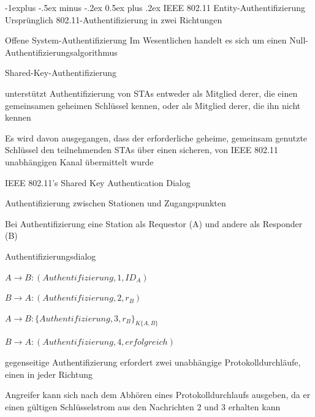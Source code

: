 \documentclass[a4paper]{article}
\makeatletter
\renewcommand{\subsection}{\@startsection{subsection}{2}{0mm}%
 {-1explus -.5ex minus -.2ex}%
 {0.5ex plus .2ex}%
 {\normalfont\normalsize\bfseries}}
\makeatother
\begin{document}
\begin{multicols}{3}
      \subsection{IEEE 802.11 Entity-Authentifizierung}
      Ursprünglich 802.11-Authentifizierung in zwei Richtungen
      \begin{description*}
            \item[Offene System-Authentifizierung] Im Wesentlichen handelt es sich um einen Null-Authentifizierungsalgorithmus
            \item[Shared-Key-Authentifizierung]
            \begin{itemize*}
                  \item unterstützt Authentifizierung von STAs entweder als Mitglied derer, die einen gemeinsamen geheimen Schlüssel kennen, oder als Mitglied derer, die ihn nicht kennen %
                  \item Es wird davon ausgegangen, dass der erforderliche geheime, gemeinsam genutzte Schlüssel den teilnehmenden STAs über einen sicheren, von IEEE 802.11 unabhängigen Kanal übermittelt wurde
            \end{itemize*}
      \end{description*}

      IEEE 802.11's Shared Key Authentication Dialog
      \begin{itemize*}
            \item Authentifizierung zwischen Stationen und Zugangspunkten %
            \item Bei Authentifizierung eine Station als Requestor (A) und andere als Responder (B)
            \item Authentifizierungsdialog
            \begin{enumerate*}
                  \item $A \rightarrow B: (Authentifizierung, 1, ID_A)$
                  \item $B \rightarrow A: (Authentifizierung, 2, r_B)$
                  \item $A \rightarrow B: \{Authentifizierung, 3, r_B\}_{K\{A,B\}}$
                  \item $B \rightarrow A: (Authentifizierung, 4, erfolgreich)$
            \end{enumerate*}
            \item gegenseitige Authentifizierung erfordert zwei unabhängige Protokolldurchläufe, einen in jeder Richtung
            \item Angreifer kann sich nach dem Abhören eines Protokolldurchlaufs ausgeben, da er einen gültigen Schlüsselstrom aus den Nachrichten 2 und 3 erhalten kann
      \end{itemize*}


\end{multicols}
\end{document}

